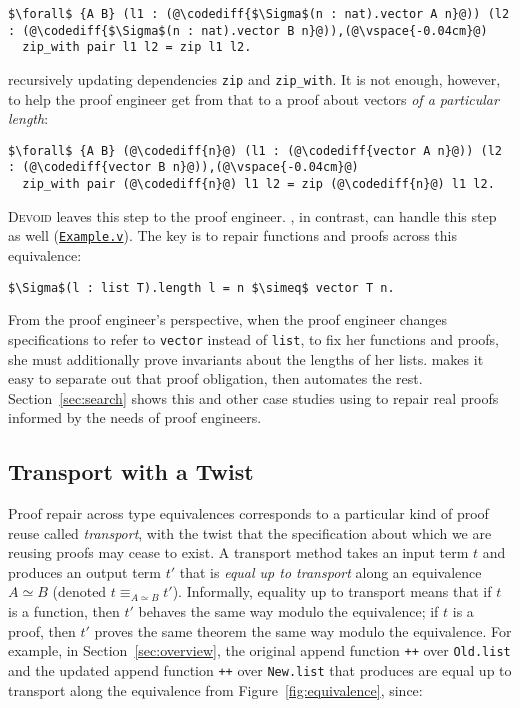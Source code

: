 \begin{lstlisting}
$\forall$ {A B} (l1 : (@\codediff{$\Sigma$(n : nat).vector A n}@)) (l2 : (@\codediff{$\Sigma$(n : nat).vector B n}@)),(@\vspace{-0.04cm}@)
  zip_with pair l1 l2 = zip l1 l2.
\end{lstlisting}
recursively updating dependencies \lstinline{zip} and \lstinline{zip_with}.
It is not enough, however, to help the proof engineer get from that to a proof about vectors \textit{of a particular length}:

\begin{lstlisting}
$\forall$ {A B} (@\codediff{n}@) (l1 : (@\codediff{vector A n}@)) (l2 : (@\codediff{vector B n}@)),(@\vspace{-0.04cm}@)
  zip_with pair (@\codediff{n}@) l1 l2 = zip (@\codediff{n}@) l1 l2.
\end{lstlisting}

\textsc{Devoid} leaves this step to the proof engineer.
\toolname, in contrast, can handle this step as well (\href{https://github.com/uwplse/pumpkin-pi/blob/master/plugin/coq/examples/Example.v}{\lstinline{Example.v}}).
The key is to repair functions and proofs across this equivalence:

\begin{lstlisting}
$\Sigma$(l : list T).length l = n $\simeq$ vector T n.
\end{lstlisting}
From the proof engineer's perspective, when the proof engineer changes specifications to refer to \lstinline{vector} instead of \lstinline{list},
to fix her functions and proofs, she must additionally prove invariants about the lengths of her lists.
\toolname makes it easy to separate out that proof obligation, then automates the rest.
Section~\ref{sec:search} shows this and other case studies using \toolname to repair real proofs
informed by the needs of proof engineers.


\subsection{Transport with a Twist}
\label{sec:repair}

Proof repair across type equivalences corresponds to a particular kind of proof reuse called \textit{transport},
with the twist that the specification about which we are reusing proofs may cease to exist.
A transport method takes an input term $t$ and produces an output term $t'$ that is \textit{equal up to transport}
along an equivalence $A \simeq B$ (denoted $t \equiv_{A \simeq B} t'$).
Informally, equality up to transport means that if $t$ is a function, then $t'$ behaves the same way modulo the equivalence;
if $t$ is a proof, then $t'$ proves the same theorem the same way modulo the equivalence.
For example, in Section~\ref{sec:overview}, the original append function \lstinline{++} over \lstinline{Old.list}
and the updated append function \lstinline{++} over \lstinline{New.list} that \toolname produces are
equal up to transport along the equivalence from Figure~\ref{fig:equivalence}, since:

